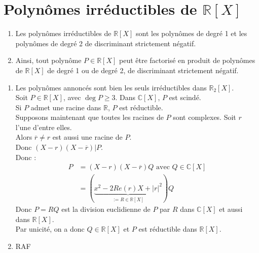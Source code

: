 \documentclass[../main.tex]{subfiles}
\begin{document}
\section{Polynômes irréductibles de $\mathbb{R}[X]$}
\begin{tcolorbox}[title=Théorème 16.101, title filled=false, colframe=orange, colback=orange!10!white]
    \begin{enumerate}
        \item Les polynômes irréductibles de $\mathbb{R}[X]$ sont les polynômes de degré 1 et les polynômes de degré 2 de discriminant strictement négatif. 
        \item Ainsi, tout polynôme $P \in \mathbb{R}[X]$ peut être factorisé en produit de polynômes de $\mathbb{R}[X]$ de degré 1 ou de degré 2, de discriminant strictement négatif. 
    \end{enumerate}
\end{tcolorbox}

\begin{enumerate}
    \item Les polynômes annoncés sont bien les seuls irréductibles dans $\mathbb{R}_2[X]$. \\
    Soit $P \in \mathbb{R}[X]$, avec $\deg P \geq 3$. Dans $\mathbb{C}[X]$, $P$ est scindé. \\
    Si $P$ admet une racine dans $\mathbb{R}$, $P$ est réductible. \\
    Supposons maintenant que toutes les racines de $P$ sont complexes. Soit $r$ l'une d'entre elles. \\
    Alors $\overline{r} \neq r$ est aussi une racine de $P$. \\
    Donc $(X - r)(X - \overline{r}) | P$. \\
    Donc : 
    \begin{align*}
        P &= (X - r)(X - \overline{r})Q \text{ avec } Q \in \mathbb{C}[X] \\
        &= (\underbrace{x^2 - 2 Re{(r)}X + |r|^2}_{:= R \in \mathbb{R}[X]})Q
    \end{align*}
    Donc $P = RQ$ est la division euclidienne de $P$ par $R$ dans $\mathbb{C}[X]$ et aussi dans $\mathbb{R}[X]$. \\
    Par unicité, on a donc $Q \in \mathbb{R}[X]$ et $P$ est réductible dans $\mathbb{R}[X]$. 

    \item RAF
\end{enumerate}
\end{document}
